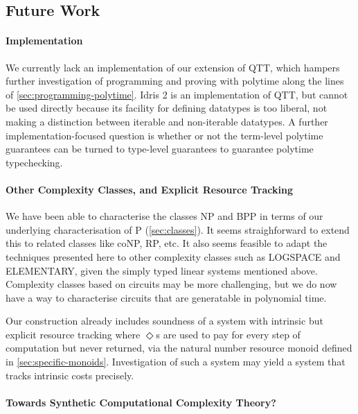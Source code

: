 \documentclass[acmsmall,screen]{acmart}
\begin{document}
\subsection{Future Work}
\label{sec:towards-synthetic-complexity-theory}

\paragraph{Implementation} We currently lack an implementation of our
extension of QTT, which hampers further investigation of programming
and proving with polytime along the lines of
\autoref{sec:programming-polytime}. Idris 2 \cite{Brady21} is an
implementation of QTT, but cannot be used directly because its facility
for defining datatypes is too liberal, not making a distinction
between iterable and non-iterable datatypes. A further
implementation-focused question is whether or not the term-level
polytime guarantees can be turned to type-level guarantees to
guarantee polytime typechecking.

\paragraph{Other Complexity Classes, and Explicit Resource Tracking}
We have been able to characterise the classes NP and BPP in terms of
our underlying characterisation of P (\autoref{sec:classes}). It seems
straighforward to extend this to related classes like coNP, RP,
etc. It also seems feasible to adapt the techniques presented here to
other complexity classes such as LOGSPACE and ELEMENTARY, given the
simply typed linear systems mentioned above. Complexity classes based
on circuits may be more challenging, but we do now have a way to
characterise circuits that are generatable in polynomial
time.

Our construction already includes soundness of a system with intrinsic
but explicit resource tracking where $\Diamond$s are used to pay for
every step of computation but never returned, via the natural number
resource monoid defined in
\autoref{sec:specific-monoids}. Investigation of such a system may
yield a system that tracks intrinsic costs precisely.

\paragraph{Towards Synthetic Computational Complexity Theory?}
\end{document}
